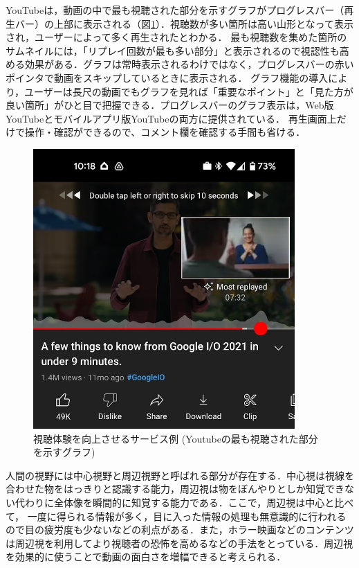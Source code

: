 YouTubeは，動画の中で最も視聴された部分を示すグラフがプログレスバー（再生バー）の上部に表示される（図\ref{youtube}）．視聴数が多い箇所は高い山形となって表示され，ユーザーによって多く再生されたとわかる．
最も視聴数を集めた箇所のサムネイルには，「リプレイ回数が最も多い部分」と表示されるので視認性も高める効果がある．グラフは常時表示されるわけではなく，プログレスバーの赤いポインタで動画をスキップしているときに表示される．
グラフ機能の導入により，ユーザーは長尺の動画でもグラフを見れば「重要なポイント」と「見た方が良い箇所」がひと目で把握できる．プログレスバーのグラフ表示は，Web版YouTubeとモバイルアプリ版YouTubeの両方に提供されている．
再生画面上だけで操作・確認ができるので、コメント欄を確認する手間も省ける．

\begin{figure}[H]
    \centering
    \includegraphics[width=10cm]{images/chapter1/YouTube.jpeg}
    \caption{視聴体験を向上させるサービス例 (Youtubeの最も視聴された部分を示すグラフ)}
    \label{youtube}
\end{figure}

人間の視野には中心視野と周辺視野と呼ばれる部分が存在する．中心視は視線を合わせた物をはっきりと認識する能力，周辺視は物をぼんやりとしか知覚できない代わりに全体像を瞬間的に知覚する能力である．ここで，周辺視は中心と比べて，
一度に得られる情報が多く，目に入った情報の処理も無意識的に行われるので目の疲労度も少ないなどの利点がある．また，ホラー映画などのコンテンツは周辺視を利用してより視聴者の恐怖を高めるなどの手法をとっている．周辺視を効果的に使うことで動画の面白さを増幅できると考えられる．

